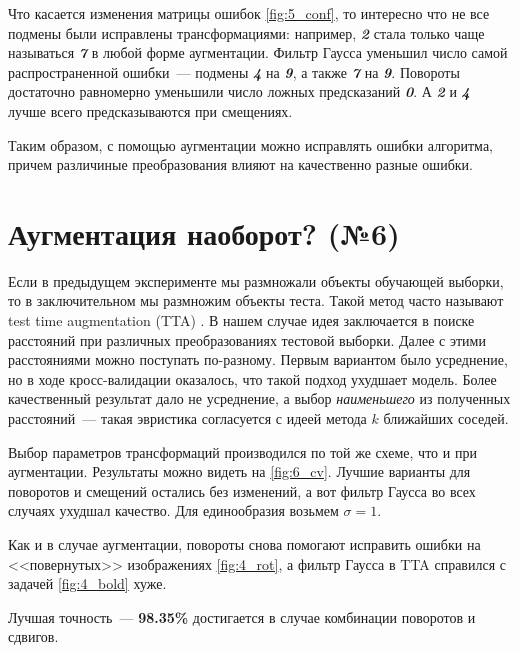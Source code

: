 \documentclass[12pt]{article}
\begin{document}
Что касается изменения матрицы ошибок \autoref{fig:5_conf}, то интересно что не все подмены были исправлены трансформациями: например, \textit{\textbf{2}} стала только чаще называться \textit{\textbf{7}} в любой форме аугментации. Фильтр Гаусса уменьшил число самой распространенной ошибки~--- подмены \textit{\textbf{4}} на \textit{\textbf{9}}, а также \textit{\textbf{7}} на \textit{\textbf{9}}. Повороты достаточно равномерно уменьшили число ложных предсказаний \textit{\textbf{0}}. А \textit{\textbf{2}} и \textit{\textbf{4}} лучше всего предсказываются при смещениях.

Таким образом, с помощью аугментации можно исправлять ошибки алгоритма, причем различиные преобразования влияют на качественно разные ошибки.

\section{Аугментация наоборот? (№6)}

Если в предыдущем эксперименте мы размножали объекты обучающей выборки, то в заключительном мы размножим объекты теста. Такой метод часто называют test time augmentation (TTA) \cite{tta}. В нашем случае идея заключается в поиске расстояний при различных преобразованиях тестовой выборки. Далее с этими расстояниями можно поступать по-разному. Первым вариантом было усреднение, но в ходе кросс-валидации оказалось, что такой подход ухудшает модель. Более качественный результат дало не усреднение, а выбор \emph{наименьшего} из полученных расстояний~--- такая эвристика согласуется с идеей метода $k$ ближайших соседей.

Выбор параметров трансформаций производился по той же схеме, что и при аугментации. Результаты можно видеть на \autoref{fig:6_cv}. Лучшие варианты для поворотов и смещений остались без изменений, а вот фильтр Гаусса во всех случаях ухудшал качество. Для единообразия возьмем $\sigma=1$.

Как и в случае аугментации, повороты снова помогают исправить ошибки на <<повернутых>> изображениях \autoref{fig:4_rot}, а фильтр Гаусса в TTA справился с задачей \autoref{fig:4_bold} хуже.

Лучшая точность~--- \textbf{98.35\%} достигается в случае комбинации поворотов и сдвигов.
\end{document}
